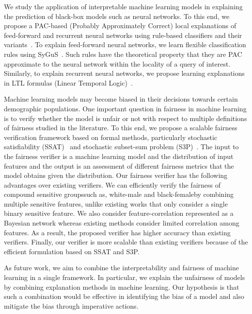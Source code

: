 \documentclass{article}
\begin{document}
	We study the application of interpretable machine learning models in explaining the prediction of black-box models such as neural networks. To this end, we propose a PAC-based (Probably Approximately Correct) local explanations of feed-forward and recurrent neural networks using rule-based classifiers and their variants~\cite{neider2020probably,ghosh2020formal}. To explain feed-forward neural networks, we learn flexible classification rules using SyGuS~\cite{neider2020probably}. Such rules have the theoretical property that they are PAC approximate to the neural network within the locality of a query of interest. Similarly, to explain recurrent neural networks, we propose learning explanations in LTL formulas (Linear Temporal Logic)~\cite{ghosh2020formal}. 
	
	
	Machine learning models may become biased in their decisions towards certain demographic populations. One important question in fairness in machine learning is to verify whether the model is unfair or not with respect to multiple definitions of fairness studied in the literature. To this end, we propose a scalable fairness verification framework based on formal methods, particularly stochastic satisfiability (SSAT)~\cite{ghosh2020justicia} and stochastic subset-sum problem (S3P)~\cite{ghosh2021algorithmic}. The input to the fairness verifier is a machine learning model and the distribution of input features and the output is an assessment of different fairness metrics that the model obtains given the distribution. Our fairness verifier has the following advantages over existing verifiers. We can efficiently verify the fairness of compound sensitive groups\textemdash such as, white-male and black-female\textemdash by combining multiple sensitive features, unlike existing works that only consider a single binary sensitive feature. We also consider feature-correlation represented as a Bayesian network whereas existing methods consider limited correlation among features. As a result, the proposed verifier has higher accuracy than existing verifiers. Finally, our verifier is more scalable than existing verifiers because of the efficient formulation based on SSAT and S3P. 
	
	
	As future work, we aim to combine the interpretability and fairness of machine learning in a single framework. In particular, we explain the unfairness of models by combining explanation methods in machine learning. Our hypothesis is that such a combination would be effective in identifying the bias of a model and also mitigate the bias through imperative actions.
	
	
	



\clearpage
\end{document}

